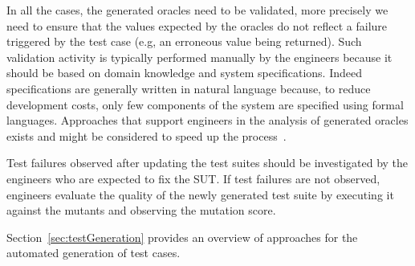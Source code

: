 In all the cases, the generated oracles need to be validated, more precisely we need to ensure that the values expected by the oracles do not reflect a failure triggered by the test case (e.g, an erroneous value being returned). Such validation activity is typically performed manually by the engineers because it should be based on domain knowledge and system specifications. Indeed specifications are generally written in natural language because, to reduce development costs, only few components of the system are specified using formal languages.
Approaches that support engineers in the analysis of generated oracles exists and might be considered to speed up the process~\cite{PastoreICSE2015}.

Test failures observed after updating the test suites should be investigated by the engineers who are expected to fix the SUT.
If test failures are not observed, engineers evaluate the quality of the newly generated test suite by executing it against the mutants and observing the mutation score. 

Section~\ref{sec:testGeneration} provides an overview of approaches for the automated generation of test cases.

